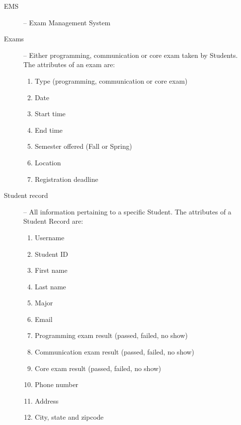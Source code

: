 
\begin{description}
   \item[EMS] -- Exam Management System 
   \item[Exams]\label{def:exam} --  Either programming,
      communication or core exam taken by Students. The attributes of an exam
      are:
      \begin{enumerate}
         \item Type (programming, communication or core exam)
         \item Date
         \item Start time
         \item End time
         \item Semester offered (Fall or Spring)
         \item Location
         \item Registration deadline
      \end{enumerate}
   \item[Student record]\label{def:record} --  All
      information pertaining to a specific Student. The attributes of a Student
      Record are:
      \begin{enumerate}
         \item Username
         \item Student ID
         \item First name
         \item Last name
         \item Major
         \item Email
         \item Programming exam result (passed, failed, no show)
         \item Communication exam result (passed, failed, no show)
         \item Core exam result (passed, failed, no show)
         \item Phone number
         \item Address
         \item City, state and zipcode
      \end{enumerate}
\end{description}

